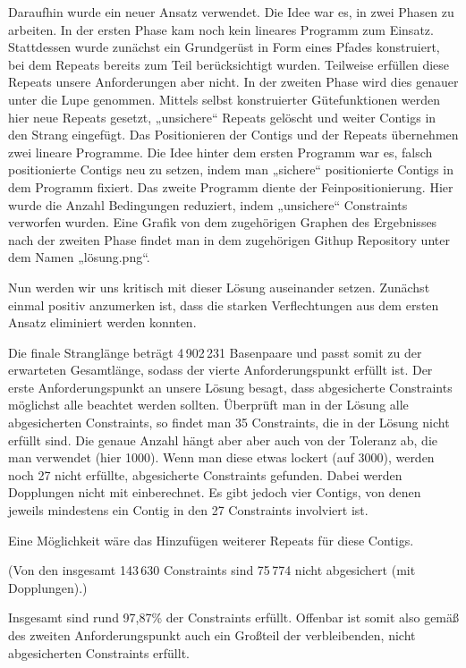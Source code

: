 Daraufhin wurde ein neuer Ansatz verwendet. Die Idee war es, in zwei Phasen zu arbeiten.
In der ersten Phase kam noch kein lineares Programm zum Einsatz. 
Stattdessen wurde zunächst ein Grundgerüst in Form eines Pfades konstruiert, bei dem Repeats bereits zum Teil berücksichtigt wurden.
Teilweise erfüllen diese Repeats unsere Anforderungen aber nicht.
In der zweiten Phase wird dies genauer unter die Lupe genommen. 
Mittels selbst konstruierter Gütefunktionen werden hier neue Repeats gesetzt, „unsichere“ Repeats gelöscht und weiter Contigs in den Strang eingefügt.
Das Positionieren der Contigs und der Repeats übernehmen zwei lineare Programme. 
Die Idee hinter dem ersten Programm war es, falsch positionierte Contigs neu zu setzen, indem man „sichere“ positionierte Contigs in dem Programm fixiert.
Das zweite Programm diente der Feinpositionierung. Hier wurde die Anzahl Bedingungen reduziert, indem „unsichere“ Constraints verworfen wurden. 
Eine Grafik von dem zugehörigen Graphen des Ergebnisses nach der zweiten Phase findet man in dem zugehörigen Githup Repository unter dem Namen „lösung.png“.


Nun werden wir uns kritisch mit dieser Lösung auseinander setzen. Zunächst einmal positiv anzumerken ist, dass die starken Verflechtungen aus dem ersten Ansatz eliminiert werden konnten.

Die finale Stranglänge beträgt 4\,902\,231 Basenpaare und passt somit zu der erwarteten Gesamtlänge, sodass der vierte Anforderungspunkt erfüllt ist. Der erste Anforderungspunkt an unsere Lösung besagt, dass abgesicherte Constraints möglichst alle beachtet werden sollten.
Überprüft man in der Lösung alle abgesicherten Constraints, so findet man 35 Constraints, die in der Lösung nicht erfüllt sind. Die genaue Anzahl hängt aber aber auch von der Toleranz ab, die man verwendet (hier 1000). 
Wenn man diese etwas lockert (auf 3000), werden noch 27 nicht erfüllte, abgesicherte Constraints gefunden. Dabei werden Dopplungen nicht mit einberechnet.
Es gibt jedoch vier Contigs, von denen jeweils mindestens ein Contig in den 27 Constraints involviert ist.

Eine Möglichkeit wäre das Hinzufügen weiterer Repeats für diese Contigs.

(Von den insgesamt 143\,630 Constraints sind 75\,774 nicht abgesichert (mit Dopplungen).)

Insgesamt sind rund 97,87\% der Constraints erfüllt. Offenbar ist somit also gemäß des zweiten Anforderungspunkt auch ein Großteil der verbleibenden, nicht abgesicherten Constraints erfüllt.

